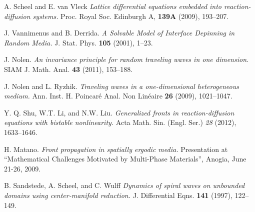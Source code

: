 \documentclass[letterpaper,11pt]{article}
\numberwithin{equation}{section}
\theoremstyle{plain}
\begin{document}
\begin{thebibliography}{99}
A. Scheel and E. van Vleck
\textit{Lattice differential equations embedded into reaction-diffusion systems.} 
Proc. Royal Soc. Edinburgh A, \textbf{139A} (2009), 193--207.

J. Vannimenus and B. Derrida.
\textit{A Solvable Model of Interface Depinning in
Random Media.}
J. Stat. Phys. \textbf{105} (2001), 1--23.

J. Nolen.
\textit{An invariance principle for random traveling waves in one dimension. }
SIAM J. Math. Anal. \textbf{43} (2011),  153--188. 

J. Nolen and L. Ryzhik.
\textit{Traveling waves in a one-dimensional heterogeneous medium.}
Ann. Inst. H. Poincaré Anal. Non Linéaire \textbf{26} (2009),  1021--1047. 

Y. Q. Shu, W.T. Li, and N.W. Liu.
\textit{Generalized fronts in reaction-diffusion equations with bistable nonlinearity.}
Acta Math. Sin. (Engl. Ser.) \textit{28} (2012), 1633--1646. 

 H. Matano. \textit{Front propagation in spatially ergodic media.}
Presentation at “Mathematical Challenges Motivated
by Multi-Phase Materials”, Anogia, June 21-26, 2009. 

B. Sandstede, A. Scheel, and C. Wulff
\textit{Dynamics of spiral waves on unbounded domains using center-manifold reduction.}
J. Differential Eqns. \textbf{141} (1997), 122--149.


\end{thebibliography}
\end{document}
